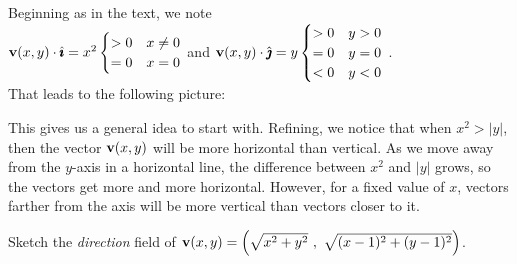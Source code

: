 \begin{solution}
Beginning as in the text, we note\\
$\mathbf{v}(x,y)\cdot\hat{\pmb{\imath}}=x^2 \begin{cases}
>0 & x \neq 0\\
=0 & x=0
\end{cases}$
\qquad and \qquad
$\mathbf{v}(x,y)\cdot\hat{\pmb{\jmath}}=y \begin{cases}
>0 & y > 0\\
=0 & y=0\\
<0 & y<0
\end{cases}$ .\\
That leads to the following picture:
\begin{center}
\end{center}
This gives us a general idea to start with. Refining, we notice that when $x^2>|y|$, then the vector $\mathbf{v}(x,y)$ will be more horizontal than vertical. As we move away from the $y$-axis in a horizontal line, the difference between $x^2$ and $|y|$ grows, so the vectors get more and more horizontal. However, for a fixed value of $x$, vectors farther from the axis will be more vertical than vectors closer to it.
\begin{center}
\end{center}
\end{solution}
\begin{question}
Sketch the \emph{direction} field of
$\mathbf{v}(x,y) = \left( \sqrt{x^2+y^2}~,~\sqrt{(x-1)^2+(y-1)^2}\right)$.
\end{question}

